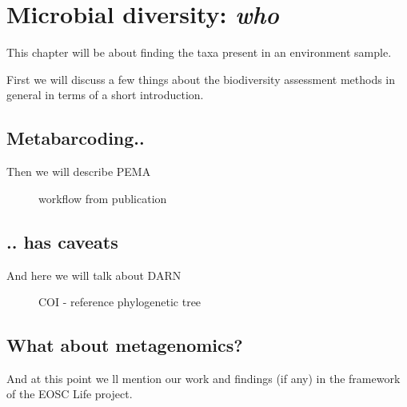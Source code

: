 
\chapter{Microbial diversity: \textit{who}}
\label{cha:2}

This chapter will be about finding the taxa present in an environment sample. 

First we will discuss a few things about the biodiversity assessment methods in general in terms of a short introduction. 

\section{Metabarcoding..}
Then we will describe PEMA


\begin{figure}{}
   \caption{workflow from publication}
\end{figure}




\section{.. has caveats}
And here we will talk about DARN


\begin{figure}{}
   \centering
   \caption{COI - reference phylogenetic tree}
\end{figure}


\section{What about metagenomics?}

And at this point we ll mention our work and 
findings (if any) in the framework of the EOSC Life project.



